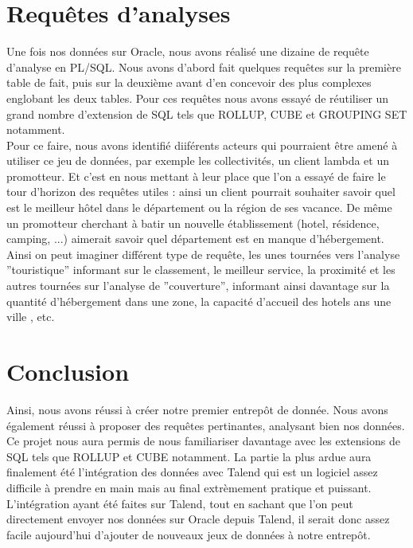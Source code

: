 \documentclass[a4paper,sffamily,12pt]{article}
\begin{document}
		\vspace{0.5cm}
			
	\section{Requêtes d'analyses}

		\vspace{0.5cm}
		
		Une fois nos données sur Oracle, nous avons réalisé une dizaine de requête d'analyse en PL/SQL. Nous avons d'abord fait quelques requêtes sur la première table de fait, puis sur la deuxième avant d'en concevoir des plus complexes englobant les deux tables. Pour ces requêtes nous avons essayé de réutiliser un grand nombre d'extension de SQL tels que ROLLUP, CUBE et GROUPING SET notamment. \\		
		
		Pour ce faire, nous avons identifié diiférents acteurs qui pourraient être amené à utiliser ce jeu de données, par exemple les collectivités, un client lambda et un promotteur. Et c'est en nous mettant à leur place que l'on a essayé de faire le tour d'horizon des requêtes utiles : ainsi un client pourrait souhaiter savoir quel est le meilleur hôtel dans le département ou la région de ses vacance. De même un promotteur cherchant à batir un nouvelle établissement (hotel, résidence, camping, ...) aimerait savoir quel département est en manque d'hébergement. Ainsi on peut imaginer différent type de requête, les unes tournées vers l'analyse ''touristique'' informant sur le classement, le meilleur service, la proximité et les autres tournées sur l'analyse de ''couverture'', informant ainsi davantage sur la quantité d'hébergement dans une zone, la capacité d'accueil des hotels ans une ville , etc. \\
		
		\vspace{0.5cm}
																
	\section{Conclusion}

		\vspace{0.5cm}
		
		Ainsi, nous avons réussi à créer notre premier entrepôt de donnée. Nous avons également réussi à proposer des requêtes pertinantes, analysant bien nos données. Ce projet nous aura permis de nous familiariser davantage avec les extensions de SQL tels que ROLLUP et CUBE notamment. La partie la plus ardue aura finalement été l'intégration des données avec Talend qui est un logiciel assez difficile à prendre en main mais au final extrèmement pratique et puissant. L'intégration ayant été faites sur Talend, tout en sachant que l'on peut directement envoyer nos données sur Oracle depuis Talend, il serait donc assez facile aujourd'hui d'ajouter de nouveaux jeux de données à notre entrepôt. \\
						
\end{document}
